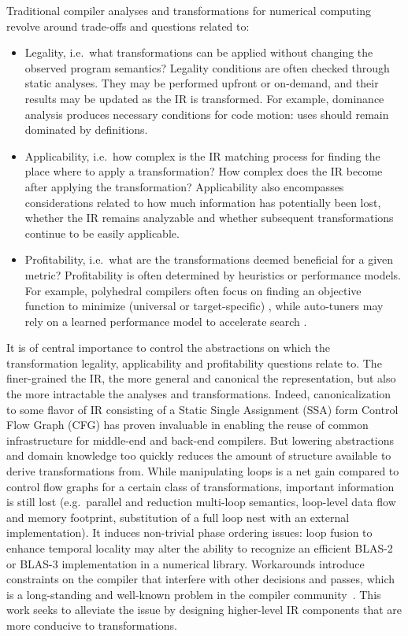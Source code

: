Traditional compiler analyses and transformations for numerical computing~\cite{AllenKennedy} revolve around trade-offs and questions related to:
\begin{itemize}
\item Legality, i.e.\ what transformations can be applied without changing the observed program semantics?
Legality conditions are often checked through static analyses. They may be performed upfront or on-demand, and their results may be updated as the IR is transformed.  
For example, dominance analysis produces necessary conditions for code motion: uses should remain dominated by definitions.
\item Applicability, i.e.\ how complex is the IR matching process for finding the place where to apply a transformation? How complex does the IR become after applying the transformation?
Applicability also encompasses considerations related to how much information has potentially been lost, whether the IR remains analyzable and whether subsequent transformations continue to be easily applicable.
\item Profitability, i.e.\ what are the transformations deemed beneficial for a given metric?
Profitability is often determined by heuristics or performance models. For example, polyhedral compilers often focus on finding an objective function to minimize (universal or target-specific) \cite{vasilache2019next}, while auto-tuners may rely on a learned performance model to accelerate search \cite{zheng2020ansor}.
\end{itemize}

It is of central importance to control the abstractions on which the transformation legality, applicability and  profitability questions relate to.
The finer-grained the IR, the more general and canonical the representation, but also the more intractable the analyses and transformations.
Indeed, canonicalization to some flavor of \LLVM IR consisting of a Static Single Assignment (SSA) form Control Flow Graph (CFG) has proven invaluable in enabling the reuse of common infrastructure for middle-end and back-end compilers.
But lowering abstractions and domain knowledge too quickly reduces the amount of structure available to derive transformations from.
While manipulating loops is a net gain compared to control flow graphs for a certain class of transformations, important information is still lost (e.g.\ parallel and reduction multi-loop semantics, loop-level data flow and memory footprint, substitution of a full loop nest with an external implementation).
It induces non-trivial phase ordering issues: loop fusion to enhance temporal locality may alter the ability to recognize an efficient BLAS-2 or BLAS-3 implementation in a numerical library.
Workarounds introduce constraints on the compiler that interfere with other decisions and passes, which is a long-standing and well-known problem in the compiler community~\cite{Click95}.
This work seeks to alleviate the issue by designing higher-level IR components that are more conducive to transformations.

